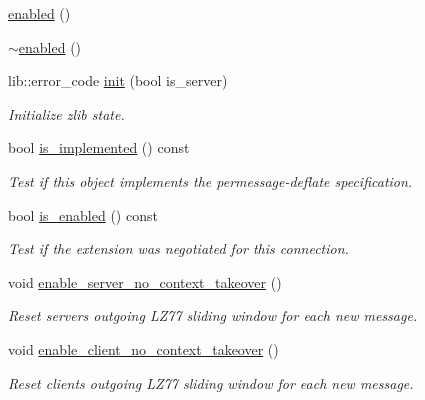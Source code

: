 \begin{DoxyCompactItemize}
\item 
\hyperlink{classwebsocketpp_1_1extensions_1_1permessage__deflate_1_1enabled_a3f0008a567db57dd73f3233ebe54086f}{enabled} ()
\item 
\hyperlink{classwebsocketpp_1_1extensions_1_1permessage__deflate_1_1enabled_aa0c3a9af501b48f3cf946a84aa8a88bb}{$\sim$enabled} ()
\item 
lib\+::error\+\_\+code \hyperlink{classwebsocketpp_1_1extensions_1_1permessage__deflate_1_1enabled_a0d842cb0cd2add8016e739dfcd675ba0}{init} (bool is\+\_\+server)
\begin{DoxyCompactList}\small\item\em Initialize zlib state. \end{DoxyCompactList}\item 
bool \hyperlink{classwebsocketpp_1_1extensions_1_1permessage__deflate_1_1enabled_aa183899c544737fc7ba4ac7e7fc73c99}{is\+\_\+implemented} () const 
\begin{DoxyCompactList}\small\item\em Test if this object implements the permessage-\/deflate specification. \end{DoxyCompactList}\item 
bool \hyperlink{classwebsocketpp_1_1extensions_1_1permessage__deflate_1_1enabled_a9b8729a774910ace8c924094a60f8c03}{is\+\_\+enabled} () const 
\begin{DoxyCompactList}\small\item\em Test if the extension was negotiated for this connection. \end{DoxyCompactList}\item 
void \hyperlink{classwebsocketpp_1_1extensions_1_1permessage__deflate_1_1enabled_a9275c22cfd6782ef72a722168d663d8b}{enable\+\_\+server\+\_\+no\+\_\+context\+\_\+takeover} ()
\begin{DoxyCompactList}\small\item\em Reset server\textquotesingle{}s outgoing L\+Z77 sliding window for each new message. \end{DoxyCompactList}\item 
void \hyperlink{classwebsocketpp_1_1extensions_1_1permessage__deflate_1_1enabled_a21e8e0200cab9dd276842ce9ecbd6639}{enable\+\_\+client\+\_\+no\+\_\+context\+\_\+takeover} ()
\begin{DoxyCompactList}\small\item\em Reset client\textquotesingle{}s outgoing L\+Z77 sliding window for each new message. \end{DoxyCompactList}\item 

\end{DoxyCompactItemize}

